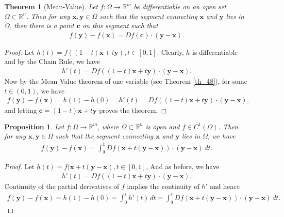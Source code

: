 \documentclass[11pt]{book}
\newtheorem{theorem}{Theorem}[chapter]
\newtheorem{proposition}{Proposition}[chapter]
\theoremstyle{definition}
\numberwithin{equation}{chapter}
\begin{document}
\begin{theorem}[Mean-Value]\label{th_79}
Let $f: \Omega \to \mathbb{R}^m$ be differentiable on an open set $\Omega \subset \mathbb{R}^n$. Then for any $\mathbf{x}, \mathbf{y} \in \Omega$ such that the segment connecting $\mathbf{x}$ and $\mathbf{y}$ lies in $\Omega$, then there is a point $\mathbf{c}$ on this segment such that
\begin{align*}
    f(\mathbf{y}) - f(\mathbf{x}) = Df(\mathbf{c}) \cdot (\mathbf{y} - \mathbf{x}).
\end{align*}
\end{theorem}
\begin{proof}
Let $h(t) = f((1 - t)\mathbf{x} + t\mathbf{y}), t \in [0,1]$. Clearly, $h$ is differentiable and by the Chain Rule, we have
\begin{align*}
    h'(t) = Df((1 - t)\mathbf{x} + t\mathbf{y}) \cdot (\mathbf{y} - \mathbf{x}).
\end{align*}
Now by the Mean Value theorem of one variable (see Theorem \ref{th_48}), for some $t \in (0,1)$, we have
\begin{align*}
    f(\mathbf{y}) - f(\mathbf{x}) = h(1) - h(0) = h'(t) = Df((1 - t)\mathbf{x} + t\mathbf{y}) \cdot (\mathbf{y} - \mathbf{x}),
\end{align*}
and letting $\mathbf{c} = (1 - t)\mathbf{x} + t\mathbf{y}$ proves the theorem.
\end{proof}

\medskip

\begin{proposition}
Let $f: \Omega \to \mathbb{R}^m$, where $\Omega \subset \mathbb{R}^n$ is open and $f \in C^1(\Omega)$. Then for any $\mathbf{x}, \mathbf{y} \in \Omega$ such that the segment connecting $\mathbf{x}$ and $\mathbf{y}$ lies in $\Omega$, we have
\begin{align*}
    f(\mathbf{y}) - f(\mathbf{x}) = \int^1_0 Df(\mathbf{x} + t(\mathbf{y} - \mathbf{x})) \cdot (\mathbf{y} - \mathbf{x}) \,dt.
\end{align*}
\end{proposition}
\begin{proof}
Let $h(t) = f(\mathbf{x} + t(\mathbf{y} - \mathbf{x}), t \in [0,1]$, And as before, we have
\begin{align*}
    h'(t) = Df((1 - t)\mathbf{x} + t\mathbf{y}) \cdot (\mathbf{y} - \mathbf{x}).
\end{align*}
Continuity of the partial derivatives of $f$ implies the continuity of $h'$ and hence
\begin{align*}
    f(\mathbf{y}) - f(\mathbf{x}) = h(1) - h(0) = \int^1_0 h'(t) \,dt = \int^1_0 Df(\mathbf{x} + t(\mathbf{y} - \mathbf{x})) \cdot (\mathbf{y} - \mathbf{x}) \,dt.
\end{align*}
\end{proof}
\end{document}
